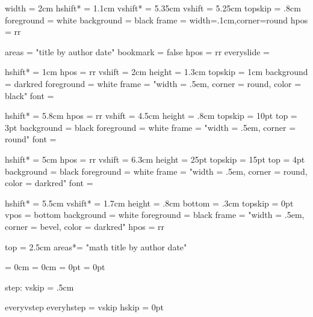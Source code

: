 \newsymbol{}

%
%
  width      = 2cm
  hshift*    = 1.1cm
  vshift*    = 5.35cm
  vshift     = 5.25cm
  topskip    = .8cm
  foreground = white
  background = black
  frame      = width=.1cm,corner=round %
  hpos       = rr


%
%
  areas      = "title by author date"
  bookmark   = false
  hpos       = rr
  everyslide = {}

  hshift*    = 1cm
  hpos       = rr
  vshift     = 2cm
  height     = 1.3cm
  topskip    = 1cm
  background = darkred
  foreground = white
  frame      = "width = .5em, corner = round, color = black"
  font       = \maintitlefont

  hshift*    = 5.8cm
  hpos       = rr
  vshift     = 4.5cm
  height     = .8cm
  topskip    = 10pt
  top        = 3pt
  background = black
  foreground = white
  frame      = "width = .5em, corner = round"
  font       = \it
  

  hshift*    = 5cm
  hpos       = rr
  vshift     = 6.3cm
  height     = 25pt
  topskip    = 15pt
  top        = 4pt
  background = black
  foreground = white
  frame      = "width = .5em, corner = round, color = darkred"
  font       = \slidetitlefont
  
  hshift*    = 5.5cm
  vshift*    = 1.7cm
  height     = .8cm
  bottom     = .3cm
  topskip    = 0pt
  vpos       = bottom
  background = white
  foreground = black
  frame      = "width = .5em, corner = bevel, color = darkred"
  hpos       = rr


%
%
  top   = 2.5cm
  areas*= "math title by author date"

\abovedisplayshortskip = 0cm
\belowdisplayshortskip = 0cm
\abovedisplayskip = 0pt
\belowdisplayskip = 0pt

%
%
\setparameter step:
  vskip = .5cm

\def\Step{%
  \step[visible=true]\quitvmode\llap{\stepsym\kern.2cm}%
  \step}

%
%
\setstep\emptystep
  everyvstep everyhstep = {}
  vskip hskip = 0pt

